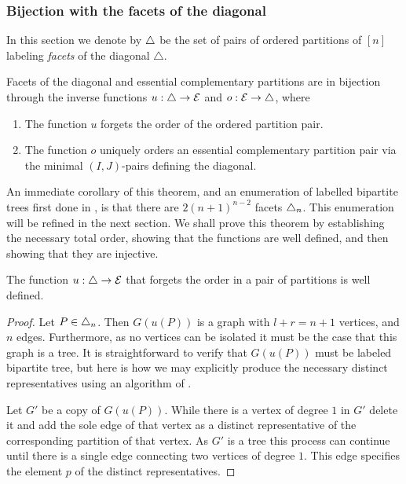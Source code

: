 \subsubsection{Bijection with the facets of the diagonal}

In this section we denote by $\triangle$ be the set of pairs of ordered partitions of $[n]$ labeling \emph{facets} of the diagonal $\triangle$. 

\begin{thm}
\label{thm:facets}
Facets of the diagonal and essential complementary partitions are in bijection through the inverse functions $u:\triangle \to \mathcal{E}$ and $o:\mathcal{E}\to \triangle$, where
\begin{enumerate}
    \item The function $u$ forgets the order of the ordered partition pair.
    \item The function $o$ uniquely orders an essential complementary partition pair via the minimal $(I,J)$-pairs defining the diagonal. 
\end{enumerate}
\end{thm}
An immediate corollary of this theorem, and an enumeration of labelled bipartite trees first done in \cite{kajitani1982number}, is that there are $2(n+1)^{n-2}$ facets $\triangle_n$.
 This enumeration will be refined in the next section.
We shall prove this theorem by establishing the necessary total order, showing that the functions are well defined, and then showing that they are injective.

\begin{lemma} 
\label{l:u-well-defined}
The function $u:\triangle \to \mathcal{E}$ that forgets the order in a pair of partitions is well defined.
\end{lemma}
\begin{proof}
Let $P \in \triangle_n$. Then $G(u(P))$ is a graph with $l+r=n+1$ vertices, and $n$ edges. Furthermore, as no vertices can be isolated it must be the case that this graph is a tree. 
It is straightforward to verify that $G(u(P))$ must be labeled bipartite tree, but here is how we may explicitly produce the necessary distinct representatives using an algorithm of \cite[Theorem 2]{kajitani1982number}.

Let $G'$ be a copy of $G(u(P))$. 
While there is a vertex of degree $1$ in $G'$ delete it and add the sole edge of that vertex as a distinct representative of the corresponding partition of that vertex. 
As $G'$ is a tree this process can continue until there is a single edge connecting two vertices of degree $1$. 
This edge specifies the element $p$ of the distinct representatives.
\end{proof}

